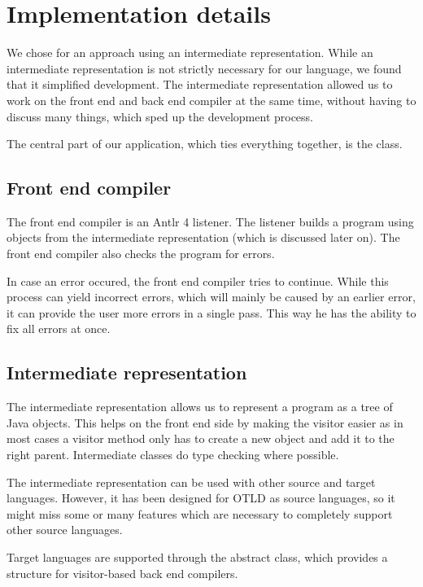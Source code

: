 \chapter{Implementation details}

We chose for an approach using an intermediate representation.
While an intermediate representation is not strictly necessary for our language, we found that it simplified development.
The intermediate representation allowed us to work on the front end and back end compiler at the same time, without having to discuss many things, which sped up the development process.

The central part of our application, which ties everything together, is the  class.

\section{Front end compiler}

The front end compiler is an Antlr 4 listener.
The listener builds a program using objects from the intermediate representation (which is discussed later on).
The front end compiler also checks the program for errors.

In case an error occured, the front end compiler tries to continue.
While this process can yield incorrect errors, which will mainly be caused by an earlier error, it can provide the user more errors in a single pass.
This way he has the ability to fix all errors at once.

\section{Intermediate representation}

The intermediate representation allows us to represent a program as a tree of Java objects.
This helps on the front end side by making the visitor easier as in most cases a visitor method only has to create a new object and add it to the right parent.
Intermediate classes do type checking where possible.

The intermediate representation can be used with other source and target languages.
However, it has been designed for OTLD as source languages, so it might miss some or many features which are necessary to completely support other source languages.

Target languages are supported through the abstract  class, which provides a structure for visitor-based back end compilers.

